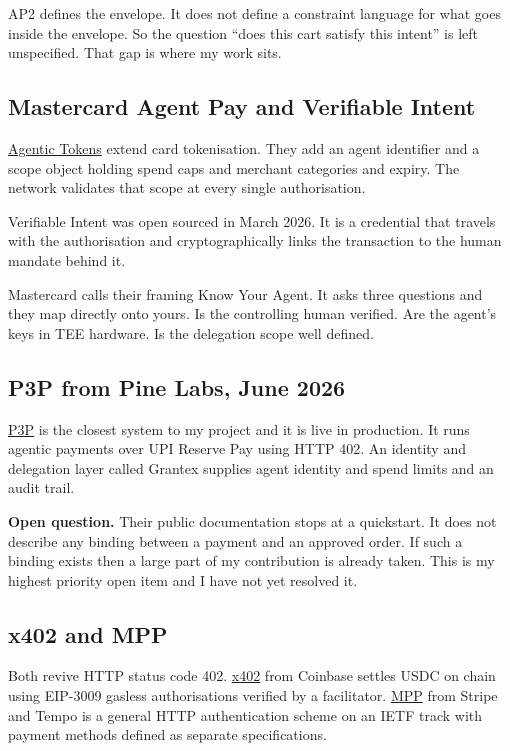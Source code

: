 \documentclass[journal,onecolumn,11pt]{IEEEtran}
\newcommand{\q}[1]{\textcolor{warnc}{\textbf{Open question.}} #1}
\begin{document}
AP2 defines the envelope. It does not define a constraint language for what goes inside
the envelope. So the question ``does this cart satisfy this intent'' is left unspecified.
That gap is where my work sits.

\subsection{Mastercard Agent Pay and Verifiable Intent}
\href{https://www.mastercard.com/us/en/business/artificial-intelligence/mastercard-agent-pay.html}{Agentic
Tokens} extend card tokenisation. They add an agent identifier and a scope object holding
spend caps and merchant categories and expiry. The network validates that scope at every
single authorisation.

Verifiable Intent was open sourced in March 2026. It is a credential that travels with
the authorisation and cryptographically links the transaction to the human mandate behind
it.

Mastercard calls their framing Know Your Agent. It asks three questions and they map
directly onto yours. Is the controlling human verified. Are the agent's keys in TEE
hardware. Is the delegation scope well defined.

\subsection{P3P from Pine Labs, June 2026}
\href{https://www.pinelabs.com/docs/online-payments/ai/p3p}{P3P} is the closest system to
my project and it is live in production. It runs agentic payments over UPI Reserve Pay
using HTTP 402. An identity and delegation layer called Grantex supplies agent identity
and spend limits and an audit trail.

\q{Their public documentation stops at a quickstart. It does not describe any binding
between a payment and an approved order. If such a binding exists then a large part of my
contribution is already taken. This is my highest priority open item and I have not yet
resolved it.}

\subsection{x402 and MPP}
Both revive HTTP status code 402. \href{https://github.com/coinbase/x402}{x402} from
Coinbase settles USDC on chain using EIP-3009 gasless authorisations verified by a
facilitator. \href{https://stripe.com/blog/machine-payments-protocol}{MPP} from Stripe
and Tempo is a general HTTP authentication scheme on an IETF track with payment methods
defined as separate specifications.
\end{document}

